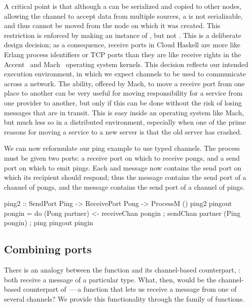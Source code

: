 \documentclass[preprint]{sigplanconf}
\begin{document}
A critical point is that although a  can be serialized and copied to other nodes, allowing the channel to accept data from multiple sources, a  is not serializable, and thus cannot be moved from the node on which it was created.
This restriction is enforced by making  an instance of , but not . 
This is a deliberate design decision; as a consequence, receive ports in Cloud Haskell are more like Erlang process identifiers or TCP ports than they are like receive rights in the Accent~\cite{Rashid81} and Mach~\cite[\S4.2.3]{free-s2008} operating system kernels.   
This decision reflects our intended execution environment, in which we expect channels to be used to communicate across a network.  
The ability, offered by Mach, to move a receive port from one place to another can be very useful for moving responsibility for a service from one provider to another, but only if this can be done without the risk of losing messages that are in transit.  
This is easy inside an operating system like Mach, but much less so in a distributed environment, especially when one of the prime reasons for moving a service to a new server is that the old server has crashed.  

We can now reformulate our ping example to use typed channels. The  process must be given two ports: a receive port on which to receive pongs, and a send port on which to emit pings. Each  and  message now contains the send port on which its recipient should respond; thus the  message contains the send port of a channel of pongs, and the  message contains the send port of a channel of pings.

\begin{code}
ping2 :: SendPort Ping -> ReceivePort Pong -> ProcessM ()
ping2 pingout pongin = 
   do { (Pong partner) <- receiveChan pongin
      ; sendChan partner (Ping pongin) 
      ; ping pingout pingin }
\end{code}



\subsection{Combining ports}
There is an analogy between the  function and its channel-based counterpart, : both receive a message of a particular type. 
What, then, would be the channel-based counterpart of \,---\,a function that lets us receive a message from one of several channels?
We provide this functionality through the  family of functions.
\end{document}
